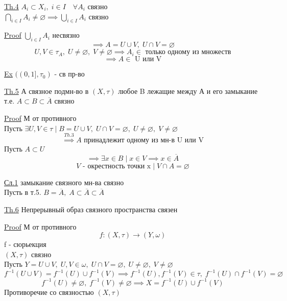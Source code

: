 \documentclass[a4paper]{article}
\begin{document}
\begin{tcolorbox}
\underline{Th.4} $ A_{i} \subset X_{i}, \; i \in I \quad \forall A_{i} $ связно\\
$ \bigcap_{i \in I} A_{i} \neq \varnothing \implies \bigcup_{i \in I} A_{i} $ 
связно

\underline{Proof} $ \bigcup_{i \in I} A_{i} $ несвязно
\[
    \implies A = U \cup V, \; U \cap V = \varnothing
\]
\[
    U,V \in \tau_{A}, \; U \neq \varnothing, \; V \neq \varnothing \implies
    A_{i} \in \text{ только одному из множеств}
\]
\[
    \implies A \in \text{ U или V}
\]
\end{tcolorbox}

\underline{Ex} $ ((0,1], \tau_{0}) $ - св пр-во

\begin{tcolorbox}
\underline{Th.5} А связное подмн-во в $ (X, \tau) $ любое B лежащие между А
и его замыкание т.е. $ A \subset B \subset \overline{A} $ связно 

\underline{Proof} М от противного\\
Пусть $ \exists U, V \in \tau\; | \; B = U \cup V, \; U \cap V = \varnothing,\;
U \neq \varnothing, \; V \neq \varnothing$ 
\[
    \stackrel{Th.3}{\implies} A \text{ принадлежит одному из мн-в U или V}
\]
Пусть $ A \subset U $ 
\[
    \implies \exists x \in B \; | \; x \in V \implies x \in \overline{A}
\]
\[
    V \text{ - окрестность точки x} \; | \; V \cap A = \varnothing
\]

\underline{Сл.1} замыкание связного мн-ва связно\\
Пусть в т.5. $ B = \overline{A}, \; A \subset \overline{A} \subset \overline{A} $ 
\end{tcolorbox}

\begin{tcolorbox}
\underline{Th.6} Непрерывный образ связного пространства связен

\underline{Proof} М от противного
\[
    f: (X,\tau) \to (Y, \omega) 
\]
f - сюрьекция\\
$ (X, \tau) $ связно\\
Пусть $ Y = U \cup V,\; U, V \in \omega, \; U \cap V = \varnothing,\; U \neq \varnothing,
\; V \neq \varnothing$ 
\[
    f^{-1}(U \cup V) = f^{-1}(U) \cup f^{-1}(V) \implies f^{-1}(U), f^{-1}(V) \in
    \tau, \; f^{-1}(U) \cap f^{-1}(V) = \varnothing
\]
\[
    f^{-1}(U) \neq \varnothing,\; f^{-1}(V) \neq \varnothing \implies
    X = f^{-1}(U) \cup f^{-1}(V)
\]
Противоречие со связностью $ (X, \tau) $ 
\end{tcolorbox}
\end{document}
